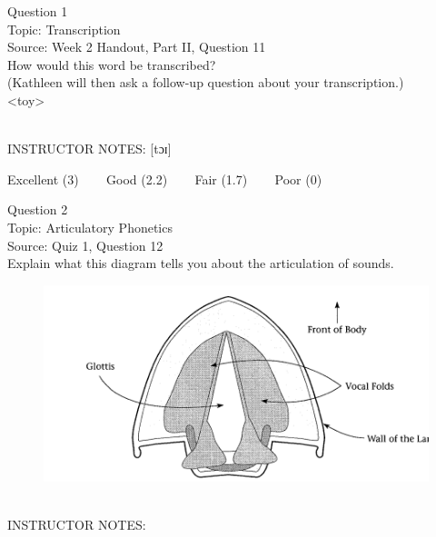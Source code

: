 \documentclass[12pt]{article}
\begin{document}
\begin{center}
\textbf{{\color{blue}{\HUGE START OF EXAM\\}}}

\textbf{{\color{blue}{\HUGE Student ID: 39207\\}}}

\textbf{{\color{blue}{\HUGE \\}}}

\end{center}
\newpage

{\large Question 1}\\

Topic: Transcription\\
Source: Week 2 Handout, Part II, Question 11\\

How would this word be transcribed?\\ (Kathleen will then ask a follow-up question about your transcription.)\\

<toy>


~\\
INSTRUCTOR NOTES: [tɔɪ]


\vfill
Excellent (3) ~~~ Good (2.2) ~~~ Fair (1.7) ~~~ Poor (0)
\newpage

{\large Question 2}\\

Topic: Articulatory Phonetics\\
Source: Quiz 1, Question 12\\

Explain what this diagram tells you about the articulation of sounds.\\

\begin{figure}[H]
\includegraphics{../images/spreadglottis_diagram.png}
\end{figure}

~\\
INSTRUCTOR NOTES: 
\end{document}
